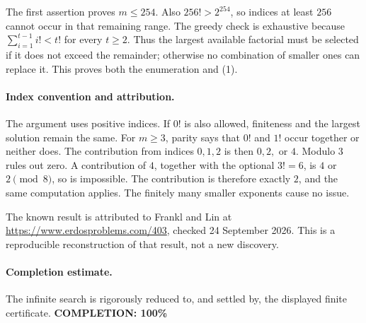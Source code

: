 The first assertion proves \(m\leq254\). Also \(256!>2^{254}\),
so indices at least \(256\) cannot occur in that remaining range.
The greedy check is exhaustive because
\(\sum_{i=1}^{t-1}i!<t!\) for every \(t\geq2\).
Thus the largest available factorial must be selected if it does not
exceed the remainder; otherwise no combination of smaller ones can
replace it. This proves both the enumeration and (1).

\paragraph{Index convention and attribution.}
The argument uses positive indices. If \(0!\) is also allowed, finiteness
and the largest solution remain the same. For \(m\geq3\), parity says
that \(0!\) and \(1!\) occur together or neither does. The contribution
from indices \(0,1,2\) is then \(0,2,\) or \(4\). Modulo \(3\) rules out
zero. A contribution of \(4\), together with the optional \(3!=6\),
is \(4\) or \(2\pmod8\), so is impossible. The contribution is therefore
exactly \(2\), and the same computation applies. The finitely many
smaller exponents cause no issue.

The known result is attributed to Frankl and Lin at
\url{https://www.erdosproblems.com/403}, checked 24 September 2026.
This is a reproducible reconstruction of that result, not a new discovery.

\paragraph{Completion estimate.}
The infinite search is rigorously reduced to, and settled by, the displayed finite certificate.
\textbf{COMPLETION: 100\%}
